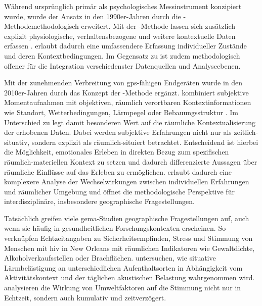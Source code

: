 Während  ursprünglich primär als psychologisches Messinstrument konzipiert wurde, wurde der Ansatz in den 1990er-Jahren durch die \emph{}-Methode\footnotemark methodologisch erweitert. Mit der -Methode lassen sich zusätzlich explizit physiologische, verhaltensbezogene und weitere kontextuelle Daten erfassen \parencite{shiffmanEcologicalMomentaryAssessment2008}.  erlaubt dadurch eine umfassendere Erfassung individueller Zustände und deren Kontextbedingungen. Im Gegensatz zu  ist  zudem methodologisch offener für die Integration verschiedenster Datenquellen und Analyseebenen.


Mit der zunehmenden Verbreitung von \gls{gps}-fähigen Endgeräten wurde  in den 2010er-Jahren durch das Konzept der \emph{}-Methode ergänzt.  kombiniert subjektive Momentaufnahmen mit objektiven, räumlich verortbaren Kontextinformationen wie Standort, Wetterbedingungen, Lärmpegel oder Bebauungsstruktur \parencite{kirchnerSpatiotemporalDeterminantsMental2016}. Im Unterschied zu  legt  damit besonderen Wert auf die räumliche Kontextualisierung der erhobenen Daten. Dabei werden subjektive Erfahrungen nicht nur als zeitlich-situativ, sondern explizit als räumlich-situiert betrachtet. Entscheidend ist hierbei die Möglichkeit, emotionales Erleben in direkten Bezug zum spezifischen räumlich-materiellen Kontext zu setzen und dadurch differenzierte Aussagen über räumliche Einflüsse auf das Erleben zu ermöglichen.  erlaubt dadurch eine komplexere Analyse der Wechselwirkungen zwischen individuellen Erfahrungen und räumlicher Umgebung und öffnet die methodologische Perspektive für interdisziplinäre, insbesondere geographische Fragestellungen.

Tatsächlich greifen viele \gls{gema}-Studien geographische Fragestellungen auf, auch wenn sie häufig in gesundheitlichen Forschungskontexten erscheinen. So verknüpfen \textcite{gasikUsingGeographicMomentary2025} Echtzeitangaben zu Sicherheitsempfinden, Stress und Stimmung von Menschen mit \gls{hiv} in New Orleans mit räumlichen Indikatoren wie Gewaltdichte, Alkoholverkaufsstellen oder Brachflächen. \textcite{zhangGeographicEcologicalMomentary2020} untersuchen, wie situative Lärmbelästigung an unterschiedlichen Aufenthaltsorten in Abhängigkeit vom Aktivitätskontext und der täglichen akustischen Belastung wahrgenommen wird. \textcite{zhangTemporalityGeographicContexts2023} analysieren die Wirkung von Umweltfaktoren auf die Stimmung nicht nur in Echtzeit, sondern auch kumulativ und zeitverzögert.

